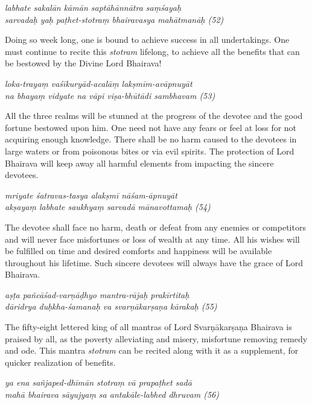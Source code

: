 \documentclass[12pt,oneside,a4paper]{article}
\newenvironment{shloka}[1]
  {\bigskip\center#1\varwidth{\linewidth}}
  {\endvarwidth\endcenter\bigskip}
\newcommand{\tl}[1]{\emph{#1}}
\begin{document}
\begin{shloka}\itshape
  labhate sakalān kāmān saptāhānnātra saṃśayaḥ\\
  sarvadaḥ yaḥ paṭhet-stotraṃ bhairavasya mahātmanāḥ (52)
\end{shloka}

Doing so week long, one is bound to achieve success in all undertakings. One
must continue to recite this \tl{stotram} lifelong, to achieve all the benefits
that can be bestowed by the Divine Lord Bhairava!

\begin{shloka}\itshape
  loka-trayaṃ vaśīkuryād-acalāṃ lakṣmīm-avāpnuyāt\\
  na bhayaṃ vidyate na vāpi viṣa-bhūtādi sambhavam (53)
\end{shloka}

All the three realms will be stunned at the progress of the devotee and the good
fortune bestowed upon him. One need not have any fears or feel at loss for not
acquiring enough knowledge. There shall be no harm caused to the devotees in
large waters or from poisonous bites or via evil spirits. The protection of Lord
Bhairava will keep away all harmful elements from impacting the sincere
devotees.

\begin{shloka}\itshape
  mriyate śatravas-tasya alakṣmī nāśam-āpnuyāt\\
  akṣayaṃ labhate saukhyaṃ sarvadā mānavottamaḥ (54)
\end{shloka}

The devotee shall face no harm, death or defeat from any enemies or competitors
and will never face misfortunes or loss of wealth at any time. All his wishes
will be fulfilled on time and desired comforts and happiness will be available
throughout his lifetime. Such sincere devotees will always have the grace of
Lord Bhairava.

\begin{shloka}\itshape
  aṣṭa pañcāśad-varṇāḍhyo mantra-rājaḥ prakīrtitaḥ\\
  dāridrya duḥkha-śamanaḥ va svarṇākarṣaṇa kārakaḥ (55)
\end{shloka}

The fifty-eight lettered king of all mantras of Lord Svarṇākarṣaṇa Bhairava is
praised by all, as the poverty alleviating and misery, misfortune removing
remedy and ode. This mantra \tl{stotram} can be recited along with it as
a supplement, for quicker realization of benefits.

\begin{shloka}\itshape
  ya ena sañjaped-dhīmān stotraṃ vā prapaṭhet sadā\\
  mahā bhairava sāyujyaṃ sa antakāle-labhed dhruvam (56)
\end{shloka}
\end{document}
